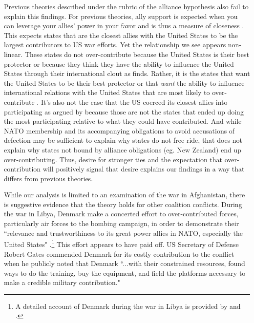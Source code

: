 \documentclass[12pt,letterpaper]{article}
\begin{document}
	Previous theories described under the rubric of the alliance hypothesis also fail to explain this findings. For previous theories, ally support is expected when you can leverage your allies' power in your favor and is thus a measure of closeness \citep{davidson_neoclassicalrealistexplanation_2011}. This expects states that are the closest allies with the United States to be the largest contributors to US war efforts. Yet the relationship we see appears non-linear. These states do not over-contribute because the United States is their best protector or because they think they have the ability to influence the United States through their international clout as \citet{ringsmose_natoburdensharingredux_2010} finds. Rather, it is the states that want the United States to be their best protector or that \textit{want} the ability to influence international relations with the United States that are most likely to over-contribute \citep{vonhlatky_greatasymmetryamerica_2010}. It's also not the case that the US coerced its closest allies into participating as argued by \citet{kupchan_natopersiangulf_1988} because those are not the states that ended up doing the most participating relative to what they could have contributed. And while NATO membership and its accompanying obligations to avoid accusations of defection may be sufficient to explain why states do not free ride, that does not explain why states not bound by alliance obligations (eg. New Zealand) end up over-contributing. Thus, desire for stronger ties and the expectation that over-contribution will positively signal that desire explains our findings in a way that differs from previous theories.

	While our analysis is limited to an examination of the war in Afghanistan, there is suggestive evidence that the theory holds for other coalition conflicts. During the war in Libya, Denmark make a concerted effort to over-contributed forces, particularly air forces to the bombing campaign, in order to demonstrate their ``relevance and trustworthiness to its great power allies in NATO, especially the United States" \citep[109]{jakobsen_goodnewslibya_2012}.\footnote{A detailed account of Denmark during the war in Libya is provided by \citet{dicke_natoburdensharinglibya_2013} and \citet{jakobsen_prestigeseekingsmallstates_2018}.} This effort appears to have paid off. US Secretary of Defense Robert Gates \citet{gates_securitydefenseagenda_2011} commended Denmark for its costly contribution to the conflict when he publicly noted that Denmark ``...with their constrained resources, found ways to do the training, buy the equipment, and field the platforms necessary to make a credible military contribution."
\end{document}
